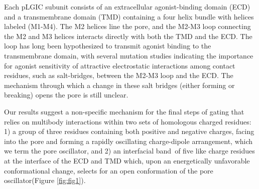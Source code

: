 \documentclass[journal=jacsat,manuscript=article]{achemso}
\newcommand{\fivering}{interfacial band~}
\newcommand{\triadns}{pore oscillator}
\begin{document}
Each pLGIC subunit consists of an extracellular agonist-binding domain (ECD) and a transmembrane domain (TMD) containing a four helix bundle with helices labeled (M1-M4).  The M2 helices line the pore, and the M2-M3 loop connecting the M2 and M3 helices interacts directly with both the TMD and the ECD.  The loop has long been hypothesized to transmit agonist binding to the transmembrane domain,\cite{Campos-Caro1996,Grosman2000,Lummis2005,Lee2005,Unwin2005, Lee2009} with several mutation studies indicating the importance for agonist sensitivity of attractive electrostatic interactions among contact residues, such as salt-bridges, between the M2-M3 loop and the ECD. \cite{Sigel1999, OShea2000, Kash2003, Hales2006} The mechanism through which a change in these salt bridges (either forming or breaking) opens the pore is still unclear.   

Our results suggest a non-specific mechanism for the final steps of gating that relies on multibody interactions within two sets of homologous charged residues: 1) a group of three residues containing both positive and negative charges, facing into the pore and forming a rapidly oscillating charge-dipole arrangement, which we term the \triadns, and 2) an \fivering of five like charge residues at the interface of the ECD and TMD which, upon an energetically unfavorable conformational change, selects for an open conformation of the \triadns  (Figure \ref{fig:fig1}).  
\end{document}
